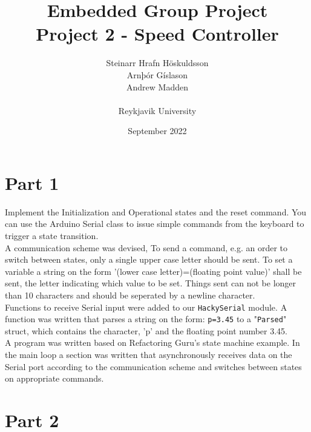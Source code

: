 \documentclass{article}
\title{Embedded Group Project\\ \large Project 2 - Speed Controller}
\author{Steinarr Hrafn Höskuldsson\\
Arnþór Gíslason\\
Andrew Madden\\
\\
Reykjavik University}
\date{September 2022}
\newcommand{\mycomment}[1]{}
\begin{document}
\maketitle
\mycomment{
\begin{figure}[h]
    \centering
    \texttt{[image: LAB3/Basic1.png]}
    \caption{"Switch test" Breadboard set up}
    \label{fig:Switch_test}
\end{figure}



}

\section*{Part 1}

Implement the Initialization and Operational states and the reset command.  You can use the Arduino Serial class to issue simple commands from the keyboard to trigger a state transition.
\\
A communication scheme was devised, To send a command, e.g. an order to switch between states, only a single upper case letter should be sent. To set a variable a string on the form '(lower case letter)=(floating point value)' shall be sent, the letter indicating which value to be set. Things sent can not be longer than 10 characters and should be seperated by a newline character.
\\
Functions to receive Serial input were added to our \verb!HackySerial! module. A function was written that parses a string on the form: \verb!p=3.45! to a "\verb!Parsed!" struct, which contains the character, 'p' and the floating point number 3.45.
\\
A program was written based on Refactoring Guru's state machine example. In the main loop a section was written that asynchronously receives data on the Serial port according to the communication scheme and switches between states on appropriate commands.

\section*{Part 2}
\end{document}
